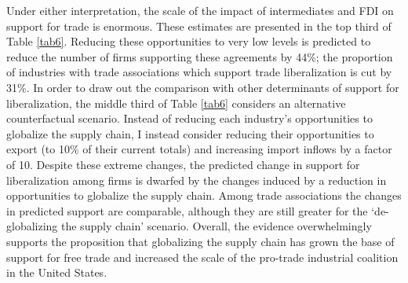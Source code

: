 \documentclass[hidelinks,12pt,letter]{article}
\begin{document}
Under either interpretation, the scale of the impact of intermediates and FDI on support for trade is enormous. These estimates are presented in the top third of Table \ref{tab6}. Reducing these opportunities to very low levels is predicted to reduce the number of firms supporting these agreements by 44\%; the proportion of industries with trade associations which support trade liberalization is cut by 31\%. In order to draw out the comparison with other determinants of support for liberalization, the middle third of Table \ref{tab6} considers an alternative counterfactual scenario. Instead of reducing each industry's opportunities to globalize the supply chain, I instead consider reducing their opportunities to export (to 10\% of their current totals) and increasing import inflows by a factor of 10. Despite these extreme changes, the predicted change in support for liberalization among firms is dwarfed by the changes induced by a reduction in opportunities to globalize the supply chain. Among trade associations the changes in predicted support are comparable, although they are still greater for the `de-globalizing the supply chain' scenario. Overall, the evidence overwhelmingly supports the proposition that globalizing the supply chain has grown the base of support for free trade and increased the scale of the pro-trade industrial coalition in the United States. 

\end{document}
